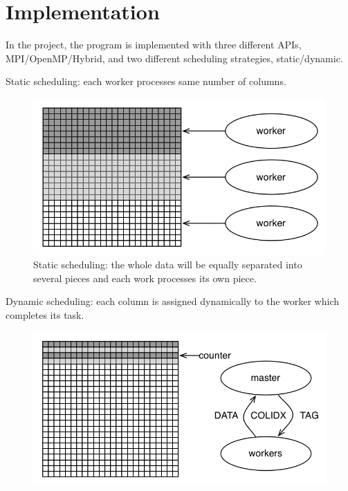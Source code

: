 \documentclass[12pt]{article}
\makeatletter
\renewenvironment{itemize}
{\list{$\bullet$}{\leftmargin\z@ \labelwidth\z@ \itemindent-\leftmargin
\let\makelabel\descriptionlabel}}
{\endlist}
\makeatother
\begin{document}
\section*{Implementation}
\vspace{-20pt}
\noindent\makebox[\linewidth]{\rule{\textwidth}{0.4pt}}
\vspace{5pt}

In the project, the program is implemented with three different APIs, MPI/OpenMP/Hybrid, and two different scheduling strategies, static/dynamic.

\begin{itemize}
    \item Static scheduling: each worker processes same number of columns.
    \vspace{-.5cm}
    \begin{figure}
        \hspace{-1cm}
        \includegraphics[scale=.5]{./flow_chart_static.png}
        \hspace{-.5cm}
        \vspace{-2cm}
        \caption{Static scheduling: the whole data will be equally separated into several pieces and each work processes its own piece.}
    \end{figure}
    \vspace{1cm}
    \item Dynamic scheduling: each column is assigned dynamically to the worker which completes its task.
    \vspace{-.5cm}
    \begin{figure}
        \hspace{-1cm}
        \includegraphics[scale=.5]{./flow_chart_dynamic.png}

\end{figure}
\end{itemize}
\end{document}
